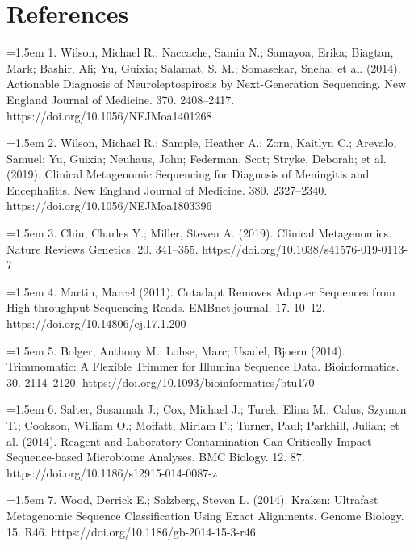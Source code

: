 \documentclass[10.5pt]{article}
\begin{document}
\section*{References}

\hangindent=1.5em  1. Wilson, Michael R.; Naccache, Samia N.; Samayoa, Erika; Biagtan, Mark; Bashir, Ali; Yu, Guixia; Salamat, S. M.; Somasekar, Sneha; et al. (2014). Actionable Diagnosis of Neuroleptospirosis by Next-Generation Sequencing. New England Journal of Medicine. 370. 2408--2417. https://doi.org/10.1056/NEJMoa1401268\par

\hangindent=1.5em  2. Wilson, Michael R.; Sample, Heather A.; Zorn, Kaitlyn C.; Arevalo, Samuel; Yu, Guixia; Neuhaus, John; Federman, Scot; Stryke, Deborah; et al. (2019). Clinical Metagenomic Sequencing for Diagnosis of Meningitis and Encephalitis. New England Journal of Medicine. 380. 2327--2340. https://doi.org/10.1056/NEJMoa1803396\par

\hangindent=1.5em  3. Chiu, Charles Y.; Miller, Steven A. (2019). Clinical Metagenomics. Nature Reviews Genetics. 20. 341--355. https://doi.org/10.1038/s41576-019-0113-7\par

\hangindent=1.5em  4. Martin, Marcel (2011). Cutadapt Removes Adapter Sequences from High-throughput Sequencing Reads. EMBnet.journal. 17. 10--12. https://doi.org/10.14806/ej.17.1.200\par

\hangindent=1.5em  5. Bolger, Anthony M.; Lohse, Marc; Usadel, Bjoern (2014). Trimmomatic: A Flexible Trimmer for Illumina Sequence Data. Bioinformatics. 30. 2114--2120. https://doi.org/10.1093/bioinformatics/btu170\par

\hangindent=1.5em  6. Salter, Susannah J.; Cox, Michael J.; Turek, Elina M.; Calus, Szymon T.; Cookson, William O.; Moffatt, Miriam F.; Turner, Paul; Parkhill, Julian; et al. (2014). Reagent and Laboratory Contamination Can Critically Impact Sequence-based Microbiome Analyses. BMC Biology. 12. 87. https://doi.org/10.1186/s12915-014-0087-z\par

\hangindent=1.5em  7. Wood, Derrick E.; Salzberg, Steven L. (2014). Kraken: Ultrafast Metagenomic Sequence Classification Using Exact Alignments. Genome Biology. 15. R46. https://doi.org/10.1186/gb-2014-15-3-r46\par
\end{document}
